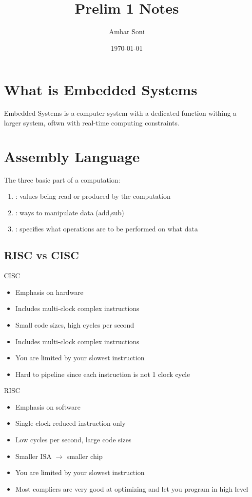 \documentclass{hw}
\title{Prelim 1 Notes} %
\author{Ambar Soni}                 %
\date{\today}                     %
\begin{document}
\maketitle
\tableofcontents

\section{What is Embedded Systems}
Embedded Systems is a computer system with a dedicated function withing a larger
system, oftwn with  real-time computing constraints.


\section{Assembly Language}
The three basic part of a computation:
\begin{enumerate}
\item {}: values being read or produced by the computation
\item {}: ways to manipulate data (add,sub)
\item {}: specifies what operations are to be performed 
  on what data
\end{enumerate}

\subsection{RISC vs CISC}
CISC
\begin{itemize}
  \item {\color{red}Emphasis on hardware}
  \item {\color{red}Includes multi-clock complex instructions}
  \item {\color{red}Small code sizes, high cycles per second}
  \item {\color{red}Includes multi-clock complex instructions}
  \item {\color{red}You are limited by your slowest instruction}
  \item {\color{red}Hard to pipeline since each instruction is not 1 clock cycle}

\end{itemize}

RISC
\begin{itemize}
  \item {\color{blue}Emphasis on software}
  \item {\color{blue}Single-clock reduced instruction only}
  \item {\color{blue}Low cycles per second, large code sizes}
  \item {\color{blue}Smaller ISA $\rightarrow$ smaller chip}
  \item {\color{blue}You are limited by your slowest instruction}
  \item {\color{blue}Most compliers are very good at optimizing and let you 
    program in high level}
\end{itemize}
\end{document}

